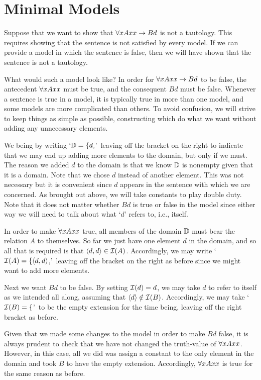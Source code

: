 \section{Minimal Models}

Suppose that we want to show that $\forall xAxx \rightarrow Bd$ is not a tautology.
This requires showing that the sentence is not satisfied by every model.
If we can provide a model in which the sentence is false, then we will have shown that the sentence is not a tautology.

What would such a model look like?
In order for $\forall xAxx \rightarrow Bd$ to be false, the antecedent $\forall x Axx$ must be true, and the consequent $Bd$ must be false.
Whenever a sentence is true in a model, it is typically true in more than one model, and some models are more complicated than others.
To avoid confusion, we will strive to keep things as simple as possible, constructing  which do what we want without adding any unnecessary elements.

We being by writing `$\mathbb{D}=\{d,$'\ leaving off the bracket on the right to indicate that we may end up adding more elements to the domain, but only if we must.
The reason we added $d$ to the domain is that we know $\mathbb{D}$ is nonempty given that it is a domain.
Note that we chose $d$ instead of another element. 
This was not necessary but it is convenient since $d$ appears in the sentence with which we are concerned.
As brought out above, we will take constants to play double duty. 
Note that it does not matter whether $Bd$ is true or false in the model since either way we will need to talk about what `$d$' refers to, i.e., itself. 

In order to make $\forall x Axx$ true, all members of the domain $\mathbb{D}$ must bear the relation $A$ to themselves.
So far we just have one element $d$ in the domain, and so all that is required is that $\langle d,d\rangle\in\mathcal{I}(A)$.
Accordingly, we may write `$\mathcal{I}(A)=\{\langle d,d\rangle$,'\ leaving off the bracket on the right as before since we might want to add more elements.

Next we want $Bd$ to be false.
By setting $\mathcal{I}(d)=d$, we may take $d$ to refer to itself as we intended all along, assuming that $\langle d\rangle\notin\mathcal{I}(B)$.
Accordingly, we may take `$\mathcal{I}(B)=\{$'\ to be the empty extension for the time being, leaving off the right bracket as before.

Given that we made some changes to the model in order to make $Bd$ false, it is always prudent to check that we have not changed the truth-value of $\forall x Axx$. 
However, in this case, all we did was assign a constant to the only element in the domain and took $B$ to have the empty extension.
Accordingly, $\forall x Axx$ is true for the same reason as before.  

